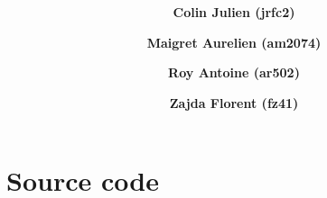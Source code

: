 \documentclass[12pt]{article}
\title{
\vspace{2in}
\Huge{\textmd{\textbf{\hmwkTitle}}}
\vspace{3in}
}
\author{
	\textbf{Colin Julien (jrfc2)}
	\and
	\textbf{Maigret Aurelien (am2074)}
	\and
	\textbf{Roy Antoine (ar502)}
	\and
	\textbf{Zajda Florent (fz41)}
}
\date{\hmwkDueDate}
\begin{document}
\maketitle




\newpage






\section{Source code}
\end{document}
